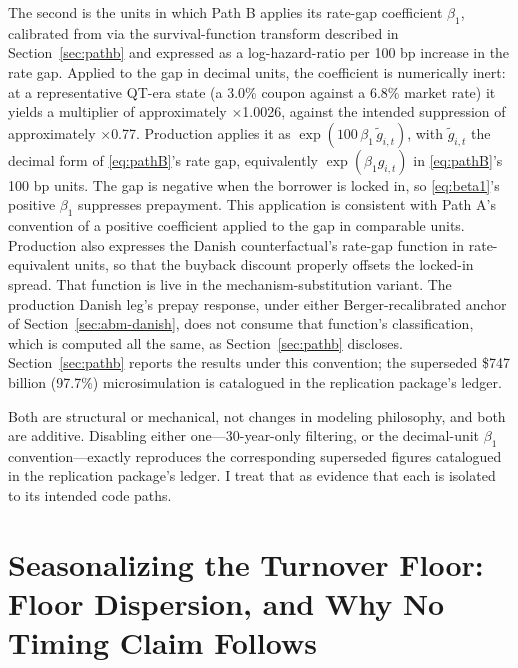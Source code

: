 \documentclass[12pt]{article}
\begin{document}
The second is the units in which Path B applies its rate-gap coefficient $\beta_1$, calibrated from \citet{liebersohn2024} via the survival-function transform described in Section~\ref{sec:pathb} and expressed as a log-hazard-ratio per 100 bp increase in the rate gap. Applied to the gap in decimal units, the coefficient is numerically inert: at a representative QT-era state (a 3.0\% coupon against a 6.8\% market rate) it yields a multiplier of approximately $\times$1.0026, against the intended suppression of approximately $\times$0.77. Production applies it as $\exp(100\,\beta_1\,\tilde g_{i,t})$, with $\tilde g_{i,t}$ the decimal form of \eqref{eq:pathB}'s rate gap, equivalently $\exp(\beta_1 g_{i,t})$ in \eqref{eq:pathB}'s 100 bp units. The gap is negative when the borrower is locked in, so \eqref{eq:beta1}'s positive $\beta_1$ suppresses prepayment. This application is consistent with Path A's convention of a positive coefficient applied to the gap in comparable units. Production also expresses the Danish counterfactual's rate-gap function in rate-equivalent units, so that the buyback discount properly offsets the locked-in spread. That function is live in the mechanism-substitution variant. The production Danish leg's prepay response, under either Berger-recalibrated anchor of Section~\ref{sec:abm-danish}, does not consume that function's classification, which is computed all the same, as Section~\ref{sec:pathb} discloses. Section~\ref{sec:pathb} reports the results under this convention; the superseded \$747 billion (97.7\%) microsimulation is catalogued in the replication package's ledger.

Both are structural or mechanical, not changes in modeling philosophy, and both are additive. Disabling either one---30-year-only filtering, or the decimal-unit $\beta_1$ convention---exactly reproduces the corresponding superseded figures catalogued in the replication package's ledger. I treat that as evidence that each is isolated to its intended code paths.

\section{Seasonalizing the Turnover Floor: Floor Dispersion, and Why No Timing Claim Follows}\label{sec:robustness-seasonalfloor}
\end{document}

